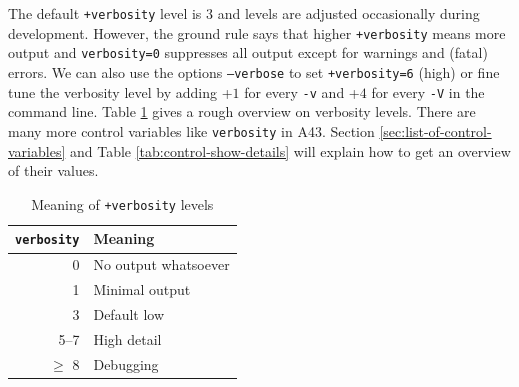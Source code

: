 \documentclass[oribibl]{llncs}
\newcommand{\ttt}[1]{\texttt{#1}}
\newcommand{\codename}{A43}
\begin{document}
\noindent
The default \ttt{+verbosity} level is $3$ and levels are adjusted occasionally during development.
However, the ground rule says that higher \ttt{+verbosity} means more output
and \ttt{verbosity=0} suppresses all output except for warnings and (fatal) errors.
We can also use the options \ttt{--verbose} to set \ttt{+verbosity=6} (high)
or fine tune the verbosity level by adding +$1$ for every \ttt{-v} and +$4$ for every \ttt{-V} in the command line.
Table \ref{tab:verbosity-level-meaning} gives a rough overview on verbosity levels.
\noindent
There are many more control variables like \ttt{verbosity} in \codename{}.
Section \ref{sec:list-of-control-variables} and Table \ref{tab:control-show-details} 
will explain how to get an overview of their values.


\begin{table}[ht!]
\caption[Meaning of verbosity levels]{
Meaning of \ttt{+verbosity} levels
} \label{tab:verbosity-level-meaning}
\centering
\begin{tabular}{|r|l|}
\hline
  \ttt{verbosity} & Meaning   \\
\hline
     0 & No output whatsoever \\
     1 & Minimal output       \\
     3 & Default low          \\
  5--7 & High detail          \\
   $\geq$ 8 & Debugging       \\
\hline
\end{tabular}
\end{table}
\end{document}
